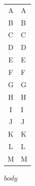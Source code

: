 \documentclass[12pt,a4paper]{ctexart}
\begin{document}
\begin{titlepage}
    \begin{center}
        \begin{tabular}{cl}
            \toprule
            A & A    \\
            B & B    \\
            C & C    \\
            D & D    \\
            E & E    \\
            F & F    \\
            G & G    \\
            H & H    \\
            I & I    \\
            J & J    \\
            K & K    \\
            L & L    \\
            M & M    \\
            \bottomrule
        \end{tabular}
    \end{center}

    \vspace{10mm}


\end{titlepage}

$body$
\end{document}
